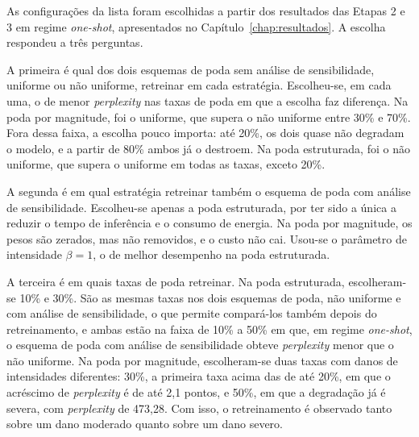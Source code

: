 As configurações da lista foram escolhidas a partir dos resultados das Etapas 2 e 3 em
regime \textit{one-shot}, apresentados no Capítulo~\ref{chap:resultados}. A escolha
respondeu a três perguntas.

A primeira é qual dos dois esquemas de poda sem análise de sensibilidade, uniforme ou não uniforme,
retreinar em cada estratégia. Escolheu-se, em cada uma, o de menor \textit{perplexity} nas
taxas de poda em que a escolha faz diferença. Na poda por magnitude, foi o uniforme, que
supera o não uniforme entre 30\% e 70\%. Fora dessa faixa, a escolha pouco importa: até 20\%, os
dois quase não degradam o modelo, e a partir de 80\% ambos já o destroem.
Na poda estruturada, foi o não uniforme, que supera o uniforme
em todas as taxas, exceto 20\%.

A segunda é em qual estratégia retreinar também o esquema de poda com análise de sensibilidade.
Escolheu-se apenas a poda estruturada, por ter sido a única a reduzir o tempo de inferência
e o consumo de energia. Na poda por magnitude, os pesos são
zerados, mas não removidos, e o custo não cai. Usou-se
o parâmetro de intensidade $\beta = 1$, o de melhor desempenho na poda estruturada.

A terceira é em quais taxas de poda retreinar. Na poda estruturada, escolheram-se 10\% e
30\%. São as mesmas taxas nos dois esquemas de poda, não uniforme e com análise de sensibilidade, o que
permite compará-los também depois do retreinamento, e ambas estão na faixa de 10\% a 50\%
em que, em regime \textit{one-shot}, o esquema de poda com análise de sensibilidade obteve
\textit{perplexity} menor que o não uniforme. Na poda por
magnitude, escolheram-se duas taxas com danos de intensidades diferentes: 30\%, a primeira
taxa acima das de até 20\%, em que o acréscimo de \textit{perplexity} é de até 2,1 pontos, e
50\%, em que a degradação já é severa, com
\textit{perplexity} de 473,28. Com isso, o retreinamento é
observado tanto sobre um dano moderado quanto sobre um dano severo.

